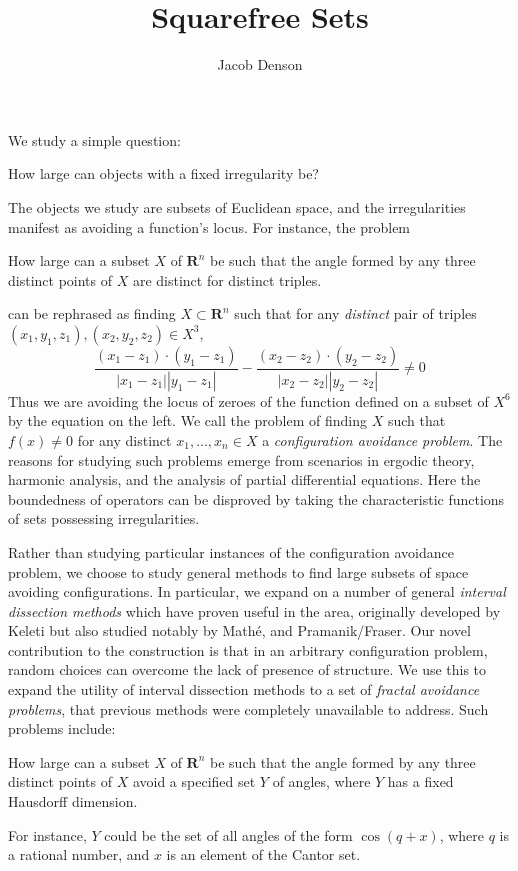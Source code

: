\documentclass{report}
\title{Squarefree Sets}
\author{Jacob Denson}
\theoremstyle{plain}
\theoremstyle{plain}
\begin{document}
\maketitle

\tableofcontents

\newpage

We study a simple question:
%
\begin{center}
    How large can objects with a fixed irregularity be?
\end{center}
%
The objects we study are subsets of Euclidean space, and the irregularities manifest as avoiding a function's locus. For instance, the problem
%
\begin{center}
    How large can a subset $X$ of $\mathbf{R}^n$ be such that the angle formed by any three distinct points of $X$ are distinct for distinct triples.
\end{center}
%
can be rephrased as finding $X \subset \mathbf{R}^n$ such that for any {\it distinct} pair of triples $(x_1,y_1,z_1), (x_2,y_2,z_2) \in X^3$,
%
\[ \frac{(x_1 - z_1) \cdot (y_1 - z_1)}{|x_1 - z_1||y_1 - z_1|} - \frac{(x_2 - z_2) \cdot (y_2 - z_2)}{|x_2 - z_2||y_2 - z_2|} \neq 0 \]
%
Thus we are avoiding the locus of zeroes of the function defined on a subset of $X^6$ by the equation on the left. We call the problem of finding $X$ such that $f(x) \neq 0$ for any distinct $x_1, \dots, x_n \in X$ a {\it configuration avoidance problem}. The reasons for studying such problems emerge from scenarios in ergodic theory, harmonic analysis, and the analysis of partial differential equations. Here the boundedness of operators can be disproved by taking the characteristic functions of sets possessing irregularities.

Rather than studying particular instances of the configuration avoidance problem, we choose to study general methods to find large subsets of space avoiding configurations. In particular, we expand on a number of general {\it interval dissection methods} which have proven useful in the area, originally developed by Keleti but also studied notably by Math\'{e}, and Pramanik/Fraser. Our novel contribution to the construction is that in an arbitrary configuration problem, random choices can overcome the lack of presence of structure. We use this to expand the utility of interval dissection methods to a set of {\it fractal avoidance problems}, that previous methods were completely unavailable to address. Such problems include:
%
\begin{center}
    How large can a subset $X$ of $\mathbf{R}^n$ be such that the angle formed by any three distinct points of $X$ avoid a specified set $Y$ of angles, where $Y$ has a fixed Hausdorff dimension.
\end{center}
%
For instance, $Y$ could be the set of all angles of the form $\cos(q + x)$, where $q$ is a rational number, and $x$ is an element of the Cantor set.
\end{document}
